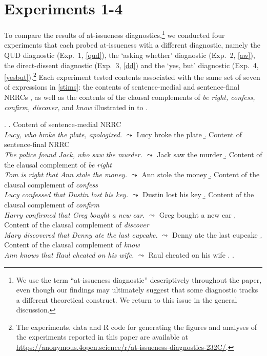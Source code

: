 \documentclass[times,linguex]{glossa}
\begin{document}
\section{Experiments 1-4 \label{sec:2_experiments}}
To compare the results of at-issueness diagnostics,\footnote{We use the term \enquote{at-issueness diagnostic} descriptively throughout the paper, even though our findings may ultimately suggest that some diagnostic tracks a different theoretical construct. We return to this issue in the general discussion.} we conducted four experiments that each probed at-issueness with a different diagnostic, namely the QUD diagnostic (Exp.~1, \ref{qud}), the `asking whether' diagnostic (Exp.~2, \ref{aw}), the direct-dissent diagnostic (Exp.~3, \ref{dd}) and the `yes, but' diagnostic (Exp.~4, \ref{yesbut}).\footnote{The experiments, data and R code for generating the figures and analyses of the experiments reported in this paper are available at \url{https://anonymous.4open.science/r/at-issueness-diagnostics-232C/}.}
Each experiment tested contents associated with the same set of seven of expressions in \ref{stims}: the contents of sentence-medial and sentence-final NRRCs \Next[a--b], as well as the contents of the clausal complements of \emph{be right, confess, confirm, discover,} and \emph{know} illustrated in \Next[c] to \Next[g].

\ex.\label{stims}
\a.\label{stims.a} Content of sentence-medial NRRC \\
\emph{Lucy, who broke the plate, apologized.} $\leadsto$ Lucy broke the plate\smallskip
\b.\label{stims.b} Content of sentence-final NRRC \\
\emph{The police found Jack, who saw the murder.} $\leadsto$ Jack saw the murder\smallskip
\b.\label{stims.e} Content of the clausal complement of \emph{be right} \\
\emph{Tom is right that Ann stole the money.} $\leadsto$ Ann stole the money\smallskip
\b.\label{stims.g} Content of the clausal complement of \emph{confess}  \\
\emph{Lucy confessed that Dustin lost his key.} $\leadsto$ Dustin lost his key \smallskip
\b.\label{stims.f} Content of the clausal complement of \emph{confirm} \\
\emph{Harry confirmed that Greg bought a new car.} $\leadsto$ Greg bought a new car\smallskip
\b.\label{stims.d} Content of the clausal complement of \emph{discover} \\
\emph{Mary discovered that Denny ate the last cupcake.} $\leadsto$ Denny ate the last cupcake\smallskip
\b.\label{stims.c} Content of the clausal complement of \emph{know} \\
\emph{Ann knows that Raul cheated on his wife.} $\leadsto$ Raul cheated on his wife
\z.
\z.
\end{document}
